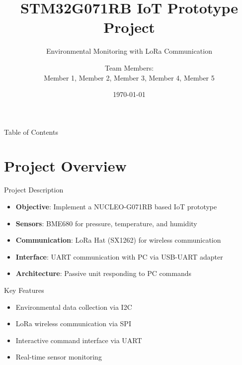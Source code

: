 \documentclass[aspectratio=169]{beamer}
\title{STM32G071RB IoT Prototype Project}
\subtitle{Environmental Monitoring with LoRa Communication}
\author{Team Members: \\
Member 1, Member 2, Member 3, Member 4, Member 5}
\institute{Embedded Systems Course}
\date{\today}
\begin{document}
\begin{frame}
\titlepage
\end{frame}

\begin{frame}{Table of Contents}
\tableofcontents
\end{frame}

\section{Project Overview}

\begin{frame}{Project Description}
\begin{itemize}
    \item \textbf{Objective}: Implement a NUCLEO-G071RB based IoT prototype
    \item \textbf{Sensors}: BME680 for pressure, temperature, and humidity
    \item \textbf{Communication}: LoRa Hat (SX1262) for wireless communication
    \item \textbf{Interface}: UART communication with PC via USB-UART adapter
    \item \textbf{Architecture}: Passive unit responding to PC commands
\end{itemize}

\begin{block}{Key Features}
\begin{itemize}
    \item Environmental data collection via I2C
    \item LoRa wireless communication via SPI
    \item Interactive command interface via UART
    \item Real-time sensor monitoring
\end{itemize}
\end{block}
\end{frame}
\end{document}
